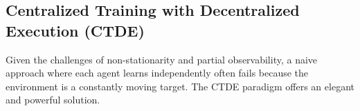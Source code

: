 
   

    


\subsection{Centralized Training with Decentralized Execution (CTDE)}
Given the challenges of non-stationarity and partial observability, a naive approach where each agent learns independently often fails because the environment is a constantly moving target. The CTDE paradigm offers an elegant and powerful solution.

